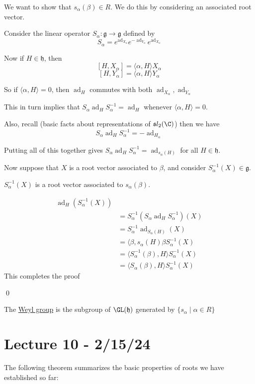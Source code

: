 \documentclass[x11names,reqno,14pt]{extarticle}
\newcommand{\mk}[1]{\mathfrak{#1}}
\newcommand{\g}{\mk{g}}
\newcommand{\h}{\mk{h}}
\DeclareMathOperator{\ad}{ad}
\begin{document}
We want to show that $s_\alpha(\beta)\in R$. We do this by considering an associated root vector.

Consider the linear operator $S_\alpha:\g\to\g$ defined by 
\[
S_\alpha = e^{\ad_{X_\alpha}}e^{-\ad_{Y_\alpha}}e^{\ad_{X_\alpha}}
\]

Now if $H \in\h$, then 
\[
[H,X_\alpha] = \langle\alpha,H\rangle X_\alpha
\]
\[
[H,Y_\alpha] = \langle\alpha,H\rangle Y_\alpha
\]

So if $\langle\alpha,H\rangle=0$, then $\ad_H$ commutes with both $\ad_{X_\alpha},\ad_{Y_\alpha}$

This in turn implies that $S_\alpha\ad_H S_\alpha^{-1} = \ad_H$ whenever $\langle\alpha,H\rangle=0$. 

Also, recall (basic facts about representations of $\mk{s}l_2(\C)$) then we have
\[
S_\alpha\ad_H S_\alpha^{-1} = -\ad_{H_\alpha}
\]

Putting all of this together gives $S_\alpha\ad_HS_\alpha^{-1} = \ad_{s_\alpha(H)}$ for all $H \in \h$. 

Now suppose that $X$ is a root vector associated to $\beta$, and consider $S_\alpha^{-1}(X)\in\g$. 

\claim

$S_\alpha^{-1}(X)$ is a root vector associated to $s_\alpha(\beta)$. 

\proof

\begin{align*}
\ad_H(S_\alpha^{-1}(X)) \\&= S_\alpha^{-1}(S_\alpha\ad_HS_\alpha^{-1})(X) \\& = S_\alpha^{-1}\ad_{S_\alpha(H)}(X) \\&=\langle\beta,s_\alpha(H)\beta S_\alpha^{-1}(X)\\&= \langle S_\alpha^{-1}(\beta),H\rangle S_\alpha^{-1}(X) \\
& = \langle S_\alpha(\beta),H\rangle S_\alpha^{-1}(X)
\end{align*}
This completes the proof

\qed


The \underline{Weyl group} is the subgroup of $\GL(\h)$ generated by $\{s_\alpha\mid\alpha\in R\}$

\section*{Lecture 10 - 2/15/24}

The following theorem summarizes the basic properties of roots we have established so far: 
\end{document}
